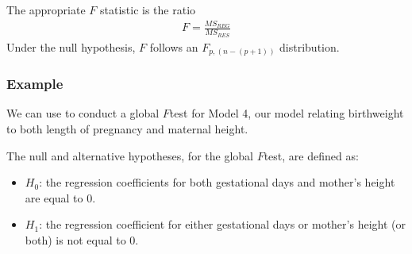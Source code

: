 \documentclass[letterpaper,10pt,english]{jupyterBook}
\begin{document}
\sphinxAtStartPar
The appropriate \(F\) statistic is the ratio
\begin{equation*}
\begin{split}
F = \frac{MS_{REG}}{MS_{RES}}
\end{split}
\end{equation*}
\sphinxAtStartPar
Under the null hypothesis, \(F\) follows an \(F_{p,(n-(p+1))}\) distribution.


\subsubsection{Example}
\label{\detokenize{14.g. Linear Regression III:id1}}
\sphinxAtStartPar
We can use  to conduct a global \(F\)\sphinxhyphen{}test for Model 4, our model relating birthweight to both length of pregnancy and maternal height.

\sphinxAtStartPar
The null and alternative hypotheses, for the global \(F\)\sphinxhyphen{}test, are defined as:
\begin{itemize}
\item {} 
\sphinxAtStartPar
\(H_0\): the regression coefficients for both gestational days and mother’s height are equal to 0.

\item {} 
\sphinxAtStartPar
\(H_1\): the regression coefficient for either gestational days or mother’s height (or both) is not equal to 0.

\end{itemize}

\begin{sphinxVerbatim}[commandchars=\\\{\}]

 
\end{sphinxVerbatim}
\end{document}
